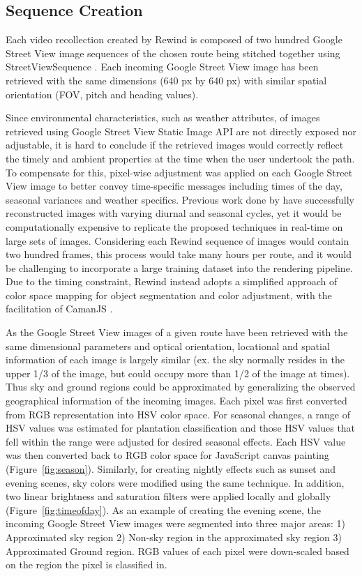 \documentclass{sigchi}
\begin{document}
\subsection{Sequence Creation}
Each video recollection created by Rewind is composed of two hundred Google Street View image sequences of the chosen route being stitched together using StreetViewSequence \cite{streetviewsequence}. Each incoming Google Street View image has been retrieved with the same dimensions (640 px by 640 px) with similar spatial orientation (FOV, pitch and heading values).

Since environmental characteristics, such as weather attributes, of images retrieved using Google Street View Static Image API are not directly exposed nor adjustable, it is hard to conclude if the retrieved images would correctly reflect the timely and ambient properties at the time when the user undertook the path. To compensate for this, pixel-wise adjustment was applied on each Google Street View image to better convey time-specific messages including times of the day, seasonal variances and weather specifics. Previous work done by \cite{laffont2014transient,shih2013data} have successfully reconstructed images with varying diurnal and seasonal cycles, yet it would be computationally expensive to replicate the proposed techniques in real-time on large sets of images. Considering each Rewind sequence of images would contain two hundred frames, this process would take many hours per route, and it would be challenging to incorporate a large training dataset into the rendering pipeline. Due to the timing constraint, Rewind instead adopts a simplified approach of color space mapping for object segmentation and color adjustment, with the facilitation of CamanJS \cite{caman}.

As the Google Street View images of a given route have been retrieved with the same dimensional parameters and optical orientation, locational and spatial information of each image is largely similar (ex. the sky normally resides in the upper 1/3 of the image, but could occupy more than 1/2 of the image at times). Thus sky and ground regions could be approximated by generalizing the observed geographical information of the incoming images. Each pixel was first converted from RGB representation into HSV color space. For seasonal changes, a range of HSV values was estimated for plantation classification and those HSV values that fell within the range were adjusted for desired seasonal effects. Each HSV value was then converted back to RGB color space for JavaScript canvas painting (Figure~\ref{fig:season}). Similarly, for creating nightly effects such as sunset and evening scenes, sky colors were modified using the same technique. In addition, two linear brightness and saturation filters were applied locally and globally (Figure~\ref{fig:timeofday}). As an example of creating the evening scene, the incoming Google Street View images were segmented into three major areas: 1) Approximated sky region 2) Non-sky region in the approximated sky region 3) Approximated Ground region. RGB values of each pixel were down-scaled based on the region the pixel is classified in. 
\end{document}
